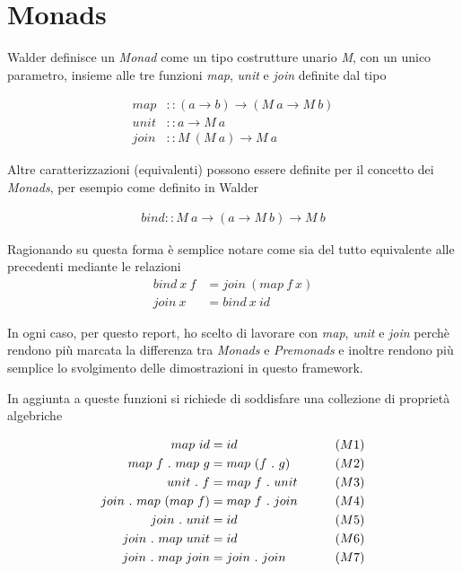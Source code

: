 \section{Monads}
\label{monads}

Walder\cite{walder0} definisce un \textit{Monad} come un tipo costrutture unario
\textit{M}, con un unico parametro, insieme alle tre funzioni \textit{map},
\textit{unit} e \textit{join} definite dal tipo

\begin{align*}
  map  &:: (a \to b) \to (M \ a \to M \ b) \\
  unit &:: a \to M \ a\\
  join &:: M\ (M \ a) \to M \ a
\end{align*}

Altre caratterizzazioni (equivalenti) possono essere definite per il concetto
dei \textit{Monads}, per esempio come definito in Walder\cite{walder1}

\begin{align*}
  bind :: M \ a \to (a \to M \ b) \to M \ b
\end{align*}

Ragionando su questa forma è semplice notare come sia del tutto equivalente alle
precedenti mediante le relazioni
\begin{align*}
  bind \ x \ f &= join \ (map \ f \ x)\\
  join\ x &= bind\ x\ id
\end{align*}

In ogni caso, per questo report, ho scelto di lavorare con \textit{map},
\textit{unit} e \textit{join} perchè rendono più marcata la differenza tra
\textit{Monads} e \textit{Premonads} e inoltre rendono più
semplice lo svolgimento delle dimostrazioni in questo framework.\newline

In aggiunta a queste funzioni si richiede di soddisfare una collezione di
proprietà algebriche

\begin{align*}
    map \ id &= id &&\qquad(M1) \\
    map \ f \ .\ map \ g &= map\ (f\ .\ g) &&\qquad(M2)\\
    unit\ .\ f &= map\ f\ .\ unit &&\qquad(M3)\\
    join\ .\ map\ (map\ f) &= map\ f\ .\ join &&\qquad(M4)\\
    join\ .\ unit &= id &&\qquad(M5)\\
    join\ .\ map\ unit &= id &&\qquad(M6)\\
    join\ .\ map\ join &= join\ .\ join &&\qquad(M7)
\end{align*}

